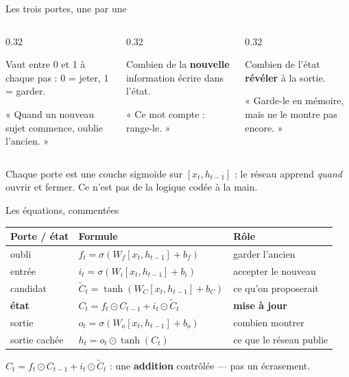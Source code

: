 \begin{frame}{Les trois portes, une par une}
\begin{columns}[t]
\begin{column}{0.32\textwidth}
\begin{wbox}
Vaut entre 0 et 1 à chaque pas : 0 = jeter, 1 = garder.

« Quand un nouveau sujet commence, oublie l'ancien. »
\end{wbox}
\end{column}
\begin{column}{0.32\textwidth}
\begin{wbox}
Combien de la \textbf{nouvelle} information écrire dans l'état.

« Ce mot compte : range-le. »
\end{wbox}
\end{column}
\begin{column}{0.32\textwidth}
\begin{wbox}
Combien de l'état \textbf{révéler} à la sortie.

« Garde-le en mémoire, mais ne le montre pas encore. »
\end{wbox}
\end{column}
\end{columns}
\vspace{2mm}
\begin{kbox}
Chaque porte est une couche sigmoïde sur $[x_t, h_{t-1}]$ : le réseau apprend
\emph{quand} ouvrir et fermer. Ce n'est pas de la logique codée à la main.
\end{kbox}
\end{frame}

\begin{frame}{Les équations, commentées}
\begin{center}
\small
\begin{tabular}{@{}lll@{}}
\toprule
\textbf{Porte / état} & \textbf{Formule} & \textbf{Rôle} \\
\midrule
oubli & $f_t = \sigma(W_f[x_t, h_{t-1}] + b_f)$ & garder l'ancien \\
entrée & $i_t = \sigma(W_i[x_t, h_{t-1}] + b_i)$ & accepter le nouveau \\
candidat & $\tilde{C}_t = \tanh(W_C[x_t, h_{t-1}] + b_C)$ & ce qu'on proposerait \\
\textbf{état} & $C_t = f_t \odot C_{t-1} + i_t \odot \tilde{C}_t$ & \textbf{mise à jour} \\
sortie & $o_t = \sigma(W_o[x_t, h_{t-1}] + b_o)$ & combien montrer \\
sortie cachée & $h_t = o_t \odot \tanh(C_t)$ & ce que le réseau publie \\
\bottomrule
\end{tabular}
\end{center}
\vspace{1mm}
\begin{kbox}
$C_t = f_t \odot C_{t-1} + i_t \odot \tilde{C}_t$ : une \textbf{addition}
contrôlée --- pas un écrasement.
\end{kbox}
\end{frame}

